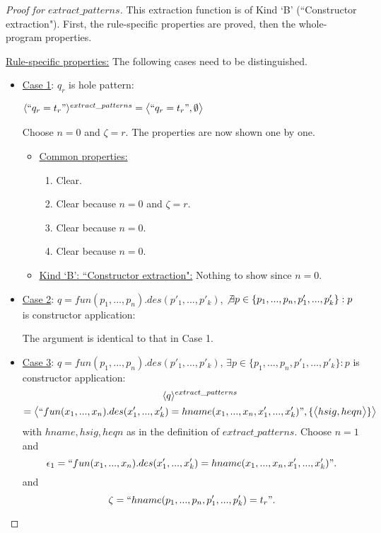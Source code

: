 \documentclass[11pt]{article} %
\begin{document}
\begin{proof}[Proof for $extract\_patterns$] This extraction function is of Kind `B' (``Constructor extraction"). First, the rule-specific properties are proved, then the whole-program properties.

\underline{Rule-specific properties:} The following cases need to be distinguished.

\begin{itemize}

\item \underline{Case 1}: $q_r$ is hole pattern:

$\langle `` q_r = t_r " \rangle^{extract\_patterns} = \big\langle `` q_r = t_r ", \emptyset \big\rangle$

Choose $n = 0$ and $\zeta = r$. The properties are now shown one by one.

\begin{itemize}
\item \underline{Common properties:}
\begin{enumerate}
\item Clear.
\item Clear because $n = 0$ and $\zeta = r$.
\item Clear because $n = 0$.
\item Clear because $n = 0$.
\end{enumerate}

\item \underline{Kind `B': ``Constructor extraction":} Nothing to show since $n = 0$.

\end{itemize}

\item \underline{Case 2}: $q = fun(p_1, ..., p_n).des(p'_1, ..., p'_k)$, $\not\exists p \in \{ p_1, ..., p_n, p'_1, ..., p'_k \}: p$ is constructor application:

The argument is identical to that in Case 1.

\item \underline{Case 3}: $q = fun(p_1, ..., p_n).des(p'_1, ..., p'_k)$, $\exists p \in \{ p_1, ..., p_n, p'_1, ..., p'_k \}: p$ is constructor application:
\begin{multline*}
\langle q \rangle^{extract\_patterns}\\
= \big\langle `` fun(x_1, ..., x_n).des(x'_1, ..., x'_k) = hname(x_1, ..., x_n, x'_1, ..., x'_k) ", \{ \big\langle hsig, heqn \big\rangle \} \big\rangle
\end{multline*}
with $hname, hsig, heqn$ as in the definition of $extract\_patterns$. Choose $n = 1$ and
\begin{equation*}
\epsilon_1 = `` fun(x_1, ..., x_n).des(x'_1, ..., x'_k) = hname(x_1, ..., x_n, x'_1, ..., x'_k) ".
\end{equation*}
and
\begin{equation*}
\zeta = `` hname(p_1, ..., p_n, p'_1, ..., p'_k) = t_r ".
\end{equation*}


\end{itemize}
\end{proof}
\end{document}

